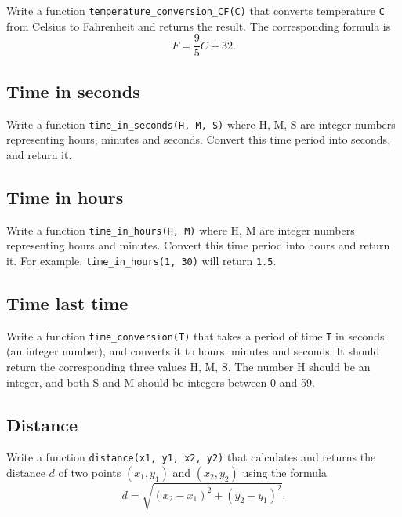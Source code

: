 Write a function {\tt temperature\_conversion\_CF(C)} that converts 
temperature {\tt C} from Celsius to Fahrenheit and returns the
result. The corresponding formula is 
$$
F = \frac{9}{5}C + 32.
$$


\subsection{Time in seconds}

Write a function {\tt time\_in\_seconds(H, M, S)} where H, M, S are
integer numbers representing hours, minutes and seconds. Convert this 
time period into seconds, and return it. 


\subsection{Time in hours}

Write a function {\tt time\_in\_hours(H, M)} where H, M are
integer numbers representing hours and minutes. Convert this 
time period into hours and return it. For example, {\tt time\_in\_hours(1, 30)}
will return {\tt 1.5}.


\subsection{Time last time}

Write a function {\tt time\_conversion(T)} that takes 
a period of time {\tt T} in seconds (an integer number), and converts it to 
hours, minutes and seconds. It should return the corresponding 
three values H, M, S. The number H should be an integer, and both S 
and M should be integers between 0 and 59.


\subsection{Distance}

Write a function {\tt distance(x1, y1, x2, y2)} that calculates and 
returns the distance $d$ of two points $(x_1, y_1)$ and $(x_2, y_2)$
using the formula 
$$
d = \sqrt{(x_2 - x_1)^2 + (y_2 - y_1)^2}.
$$ 

